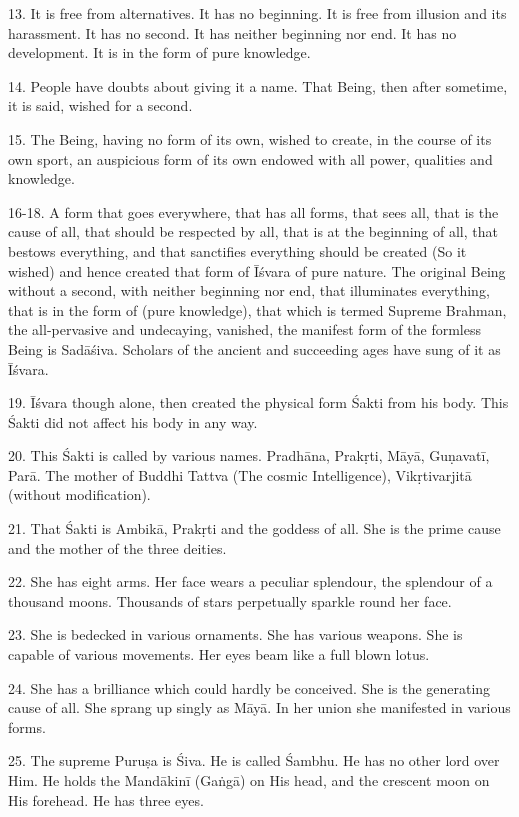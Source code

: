 13. It is free from alternatives. It has no beginning. It is free from illusion
and its harassment. It has no second. It has neither beginning nor end. It has
no development. It is in the form of pure knowledge.

14. People have doubts about giving it a name. That Being, then after sometime,
it is said, wished for a second.

15. The Being, having no form of its own, wished to create, in the course of its
own sport, an auspicious form of its own endowed with all power, qualities and
knowledge.

16-18. A form that goes everywhere, that has all forms, that sees all, that is
the cause of all, that should be respected by all, that is at the beginning of
all, that bestows everything, and that sanctifies everything should be created
(So it wished) and hence created that form of Īśvara of pure nature.
The original Being without a second, with neither beginning nor end, that
illuminates everything, that is in the form of  (pure knowledge), that
which is termed Supreme Brahman, the all-pervasive and undecaying, vanished,
the manifest form of the formless Being is Sadāśiva. Scholars of the ancient and
succeeding ages have sung of it as Īśvara.

19. Īśvara though alone, then created the physical form Śakti from his body.
This Śakti did not affect his body in any way.

20. This Śakti is called by various names. Pradhāna, Prakṛti, Māyā, Guṇavatī,
Parā. The mother of Buddhi Tattva (The cosmic Intelligence), Vikṛtivarjitā
(without modification).

21. That Śakti is Ambikā, Prakṛti and the goddess of all. She is the prime cause
and the mother of the three deities.

22. She has eight arms. Her face wears a peculiar splendour, the splendour of
a thousand moons. Thousands of stars perpetually sparkle round her face.

23. She is bedecked in various ornaments. She has various weapons. She is
capable of various movements. Her eyes beam like a full blown lotus.

24. She has a brilliance which could hardly be conceived. She is the generating
cause of all. She sprang up singly as Māyā. In her union she manifested in
various forms.

25. The supreme Puruṣa is Śiva. He is called Śambhu. He has no other lord over
Him. He holds the Mandākinī (Gaṅgā) on His head, and the crescent moon on His
forehead. He has three eyes.

